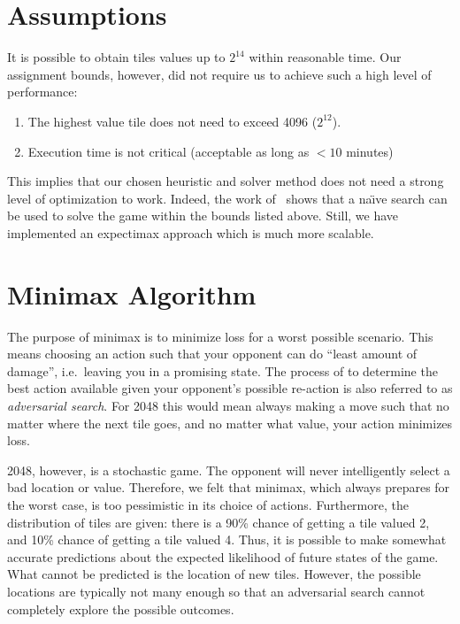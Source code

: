\documentclass[journal]{IEEEtran}
\def\naive{na\"{\i}ve}
\begin{document}
\section*{Assumptions}
It is possible to obtain tiles values up to $2^{14}$ within reasonable time.
Our assignment bounds, however, did not require us to achieve such a high level
of performance:
\begin{enumerate}
    \item The highest value tile does not need to exceed 4096 ($2^{12}$).
    \item Execution time is not critical (acceptable as long as $< 10$ minutes)
\end{enumerate}
This implies that our chosen heuristic and solver method does not need a strong
level of optimization to work. Indeed, the work of~\cite{brutesolver} shows that
a \naive{} search can be used to solve the game within the bounds listed above.
Still, we have implemented an expectimax approach which is much more scalable.

\section*{Minimax Algorithm}
The purpose of minimax is to minimize loss for a worst possible scenario.
This means choosing an action such that your opponent can do ``least amount of damage'',
i.e.\ leaving you in a promising state. The process of to determine the best
action available given your opponent's possible re-action is also referred to as 
\textit{adversarial search}.
For 2048 this would mean always making a move such that no matter where the next
tile goes, and no matter what value, your action minimizes loss.


2048, however, is a stochastic game. The opponent will never intelligently
select a bad location or value. Therefore, we felt that minimax, which always prepares
for the worst case, is too pessimistic in its choice of actions. Furthermore, the
distribution of tiles are given: there is a 90\% chance of getting a
tile valued 2, and 10\% chance of getting a tile valued 4. Thus, it is possible
to make somewhat accurate predictions about the expected likelihood of future states of the
game. What cannot be predicted is the location of new tiles. However, the possible
locations are typically not many enough so that an adversarial search cannot completely
explore the possible outcomes.
\end{document}
